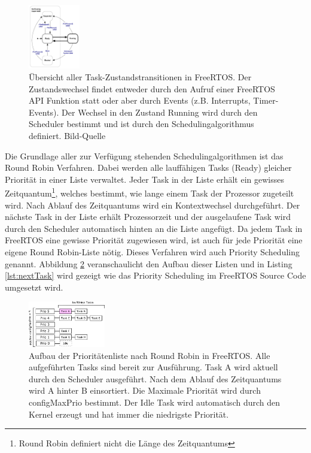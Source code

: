 \begin{figure}[ht!]
	\centering
		\includegraphics[width=0.2\textwidth]{Pictures/FreeRTOSOrg/taskStates.png}
	\caption{Übersicht aller Task-Zustandstransitionen in FreeRTOS. Der Zustandswechsel findet entweder durch den Aufruf einer FreeRTOS API Funktion statt oder aber durch Events (z.B. Interrupts, Timer-Events). Der Wechsel in den Zustand Running wird durch den Scheduler bestimmt und ist durch den Schedulingalgorithmus definiert.  Bild-Quelle~\protect{}}
	\label{fig:TaskStates}
\end{figure} 
\newline
Die Grundlage aller zur Verfügung stehenden Scheduling\-algorithmen ist das Round Robin Verfahren\cite{9783827373427}. Dabei werden alle lauf\-fäh\-igen Tasks (Ready) gleicher Priorität in einer Liste verwaltet. Jeder Task in der Liste erhält ein gewisses Zeitquantum\footnote{Round Robin definiert nicht die Länge des Zeitquantums}, welches bestimmt, wie lange einem Task der Prozessor zugeteilt wird. Nach Ablauf des Zeitquantums wird ein Kontextwechsel durchgeführt. Der näch\-ste Task in der Liste erhält Prozessorzeit und der ausgelaufene Task wird durch den Scheduler automatisch hinten an die Liste angefügt. Da jedem Task in FreeRTOS eine gewisse Priorität zugewiesen wird, ist auch für jede Priorität eine eigene Round Robin-Liste nötig. Dieses Verfahren wird auch Priority Scheduling \cite{9783827373427} genannt. Abbildung \ref{fig:PrioList1} veranschaulicht den Aufbau dieser Listen und in Listing \ref{lst:nextTask} wird gezeigt wie das Priority Scheduling im FreeRTOS Source Code umgesetzt wird. 
\begin{figure}[htb]
	\centering
		\includegraphics[width=0.3\textwidth]{Pictures/Scheduling/PrioList1.png}
	\caption{Aufbau der Prioritätenliste nach Round Robin in FreeRTOS. Alle aufgeführten Tasks sind bereit zur Ausführung. Task A wird aktuell durch den Scheduler ausgeführt. Nach dem Ablauf des Zeitquantums wird A hinter B einsortiert. Die Maximale Priorität wird durch configMaxPrio bestimmt. Der Idle Task wird automatisch durch den Kernel erzeugt und hat immer die niedrigste Priorität. }
	\label{fig:PrioList1}
\end{figure}
